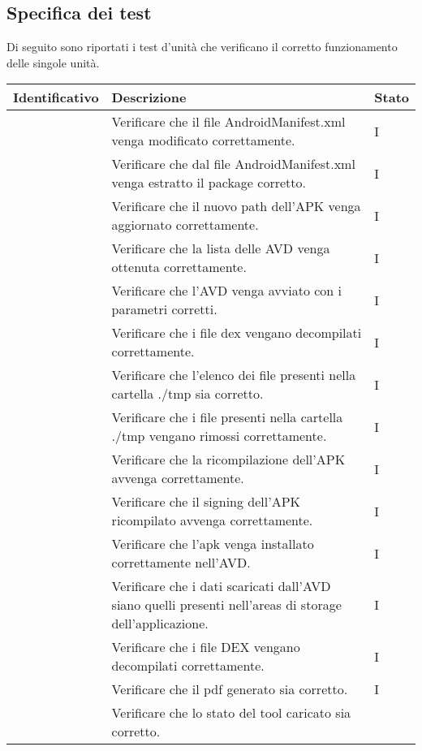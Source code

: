 \subsection{Specifica dei test}\label{subsec:specifica-dei-test-unitari}
Di seguito sono riportati i test d'unità che verificano il corretto funzionamento delle singole unità.
\begin{longtable}{ |C{3cm} | C{8.5cm}| C{1.5cm} |}
    \hline
    \textbf{Identificativo} &
    \textbf{Descrizione} &
    \textbf{Stato} \\\hline
     & Verificare che il file AndroidManifest.xml venga modificato correttamente.
    & I \\\hline
     & Verificare che dal file AndroidManifest.xml venga estratto il package corretto.
    & I \\\hline
     & Verificare che il nuovo path dell'APK venga aggiornato correttamente.
    & I \\\hline
     & Verificare che la lista delle AVD venga ottenuta correttamente.
    & I \\\hline
     & Verificare che l'AVD venga avviato con i parametri corretti.
    & I \\\hline
     & Verificare che i file dex vengano decompilati correttamente.
    & I \\\hline
     & Verificare che l'elenco dei file presenti nella cartella ./tmp sia corretto.
    & I \\\hline
     & Verificare che i file presenti nella cartella ./tmp vengano rimossi correttamente.
    & I \\\hline
     & Verificare che la ricompilazione dell'APK avvenga correttamente.
    & I \\\hline
     & Verificare che il signing dell'APK ricompilato avvenga correttamente.
    & I \\\hline
     & Verificare che l'apk venga installato correttamente nell'AVD.
    & I \\\hline
     & Verificare che i dati scaricati dall'AVD siano quelli presenti nell'areas di storage dell'applicazione.
    & I \\\hline
     & Verificare che i file DEX vengano decompilati correttamente.
    & I \\\hline
     & Verificare che il pdf generato sia corretto.
    & I \\\hline
     & Verificare che lo stato del tool caricato sia corretto.

\end{longtable}
